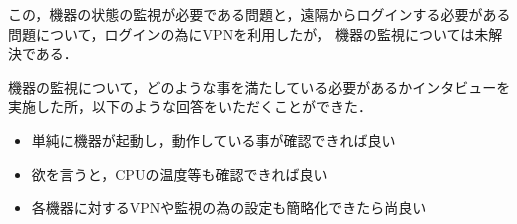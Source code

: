 この，機器の状態の監視が必要である問題と，遠隔からログインする必要がある問題について，ログインの為にVPNを利用したが，
機器の監視については未解決である．

機器の監視について，どのような事を満たしている必要があるかインタビューを実施した所，以下のような回答をいただくことができた．
\begin{itemize}
\item 単純に機器が起動し，動作している事が確認できれば良い
\item 欲を言うと，CPUの温度等も確認できれば良い
\item 各機器に対するVPNや監視の為の設定も簡略化できたら尚良い
\end{itemize}

